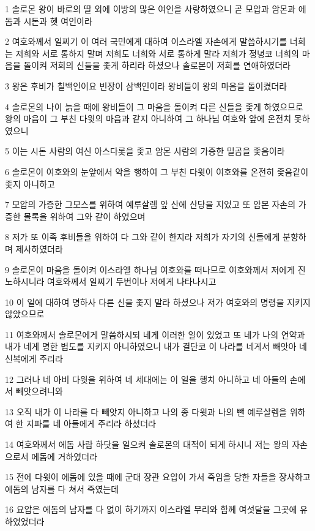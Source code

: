 \par 1 솔로몬 왕이 바로의 딸 외에 이방의 많은 여인을 사랑하였으니 곧 모압과 암몬과 에돔과 시돈과 헷 여인이라
\par 2 여호와께서 일찌기 이 여러 국민에게 대하여 이스라엘 자손에게 말씀하시기를 너희는 저희와 서로 통하지 말며 저희도 너희와 서로 통하게 말라 저희가 정녕코 너희의 마음을 돌이켜 저희의 신들을 좇게 하리라 하셨으나 솔로몬이 저희를 연애하였더라
\par 3 왕은 후비가 칠백인이요 빈장이 삼백인이라 왕비들이 왕의 마음을 돌이켰더라
\par 4 솔로몬의 나이 늙을 때에 왕비들이 그 마음을 돌이켜 다른 신들을 좇게 하였으므로 왕의 마음이 그 부친 다윗의 마음과 같지 아니하여 그 하나님 여호와 앞에 온전치 못하였으니
\par 5 이는 시돈 사람의 여신 아스다롯을 좇고 암몬 사람의 가증한 밀곰을 좇음이라
\par 6 솔로몬이 여호와의 눈앞에서 악을 행하여 그 부친 다윗이 여호와를 온전히 좇음같이 좇지 아니하고
\par 7 모압의 가증한 그모스를 위하여 예루살렘 앞 산에 산당을 지었고 또 암몬 자손의 가증한 몰록을 위하여 그와 같이 하였으며
\par 8 저가 또 이족 후비들을 위하여 다 그와 같이 한지라 저희가 자기의 신들에게 분향하며 제사하였더라
\par 9 솔로몬이 마음을 돌이켜 이스라엘 하나님 여호와를 떠나므로 여호와께서 저에게 진노하시니라 여호와께서 일찌기 두번이나 저에게 나타나시고
\par 10 이 일에 대하여 명하사 다른 신을 좇지 말라 하셨으나 저가 여호와의 명령을 지키지 않았으므로
\par 11 여호와께서 솔로몬에게 말씀하시되 네게 이러한 일이 있었고 또 네가 나의 언약과 내가 네게 명한 법도를 지키지 아니하였으니 내가 결단코 이 나라를 네게서 빼앗아 네 신복에게 주리라
\par 12 그러나 네 아비 다윗을 위하여 네 세대에는 이 일을 행치 아니하고 네 아들의 손에서 빼앗으려니와
\par 13 오직 내가 이 나라를 다 빼앗지 아니하고 나의 종 다윗과 나의 뺀 예루살렘을 위하여 한 지파를 네 아들에게 주리라 하셨더라
\par 14 여호와께서 에돔 사람 하닷을 일으켜 솔로몬의 대적이 되게 하시니 저는 왕의 자손으로서 에돔에 거하였더라
\par 15 전에 다윗이 에돔에 있을 때에 군대 장관 요압이 가서 죽임을 당한 자들을 장사하고 에돔의 남자를 다 쳐서 죽였는데
\par 16 요압은 에돔의 남자를 다 없이 하기까지 이스라엘 무리와 함께 여섯달을 그곳에 유하였었더라
